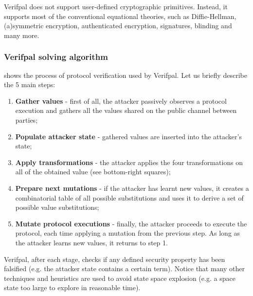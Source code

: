 Verifpal does not support user-defined cryptographic primitives. Instead, it supports most of the conventional equational theories, such as Diffie-Hellman, (a)symmetric encryption, authenticated encryption, signatures, blinding and many more.

\subsubsection{Verifpal solving algorithm}

 shows the process of protocol verification used by Verifpal. Let us briefly describe the 5 main steps:

\begin{enumerate}
    \item{\textbf{Gather values} - first of all, the attacker passively observes a protocol execution and gathers all the values shared on the public channel between parties;}
    \item{\textbf{Populate attacker state} - gathered values are inserted into the attacker's state;}
    \item{\textbf{Apply transformations} - the attacker applies the four transformations on all of the obtained value (see bottom-right squares);}
    \item{\textbf{Prepare next mutations} - if the attacker has learnt new values, it creates a combinatorial table of all possible substitutions and uses it to derive a set of possible value substitutions;}
    \item{\textbf{Mutate protocol executions} - finally, the attacker proceeds to execute the protocol, each time applying a mutation from the previous step. As long as the attacker learns new values, it returns to step 1.}
\end{enumerate}

Verifpal, after each stage, checks if any defined security property has been falsified (e.g. the attacker state contains a certain term).
Notice that many other techniques and heuristics are used to avoid state space explosion (e.g. a space state too large to explore in reasonable time).

